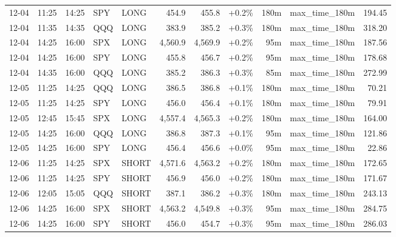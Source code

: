 \documentclass[11pt,a4paper,twoside]{article}
\begin{document}
\begin{center}
\begin{longtable}{>{\color{txtmain}}l l l l l r r r r >{\color{txtmain}}l r}
12-04 & 11:25 & 14:25 & SPY & LONG & 454.9 & 455.8 & \textcolor{wingreen}{+0.2\%} & 180m & max\_time\_180m & \textcolor{wingreen}{194.45} \\
12-04 & 11:35 & 14:35 & QQQ & LONG & 383.9 & 385.2 & \textcolor{wingreen}{+0.3\%} & 180m & max\_time\_180m & \textcolor{wingreen}{318.20} \\
12-04 & 14:25 & 16:00 & SPX & LONG & 4,560.9 & 4,569.9 & \textcolor{wingreen}{+0.2\%} & 95m & max\_time\_180m & \textcolor{wingreen}{187.56} \\
12-04 & 14:25 & 16:00 & SPY & LONG & 455.8 & 456.7 & \textcolor{wingreen}{+0.2\%} & 95m & max\_time\_180m & \textcolor{wingreen}{178.68} \\
12-04 & 14:35 & 16:00 & QQQ & LONG & 385.2 & 386.3 & \textcolor{wingreen}{+0.3\%} & 85m & max\_time\_180m & \textcolor{wingreen}{272.99} \\
12-05 & 11:25 & 14:25 & QQQ & LONG & 386.5 & 386.8 & \textcolor{wingreen}{+0.1\%} & 180m & max\_time\_180m & \textcolor{wingreen}{70.21} \\
12-05 & 11:25 & 14:25 & SPY & LONG & 456.0 & 456.4 & \textcolor{wingreen}{+0.1\%} & 180m & max\_time\_180m & \textcolor{wingreen}{79.91} \\
12-05 & 12:45 & 15:45 & SPX & LONG & 4,557.4 & 4,565.3 & \textcolor{wingreen}{+0.2\%} & 180m & max\_time\_180m & \textcolor{wingreen}{164.00} \\
12-05 & 14:25 & 16:00 & QQQ & LONG & 386.8 & 387.3 & \textcolor{wingreen}{+0.1\%} & 95m & max\_time\_180m & \textcolor{wingreen}{121.86} \\
12-05 & 14:25 & 16:00 & SPY & LONG & 456.4 & 456.6 & \textcolor{wingreen}{+0.0\%} & 95m & max\_time\_180m & \textcolor{wingreen}{22.86} \\
12-06 & 11:25 & 14:25 & SPX & SHORT & 4,571.6 & 4,563.2 & \textcolor{wingreen}{+0.2\%} & 180m & max\_time\_180m & \textcolor{wingreen}{172.65} \\
12-06 & 11:25 & 14:25 & SPY & SHORT & 456.9 & 456.0 & \textcolor{wingreen}{+0.2\%} & 180m & max\_time\_180m & \textcolor{wingreen}{171.67} \\
12-06 & 12:05 & 15:05 & QQQ & SHORT & 387.1 & 386.2 & \textcolor{wingreen}{+0.3\%} & 180m & max\_time\_180m & \textcolor{wingreen}{243.13} \\
12-06 & 14:25 & 16:00 & SPX & SHORT & 4,563.2 & 4,549.8 & \textcolor{wingreen}{+0.3\%} & 95m & max\_time\_180m & \textcolor{wingreen}{284.75} \\
12-06 & 14:25 & 16:00 & SPY & SHORT & 456.0 & 454.7 & \textcolor{wingreen}{+0.3\%} & 95m & max\_time\_180m & \textcolor{wingreen}{286.03} \\

\end{longtable}
\end{center}
\end{document}
